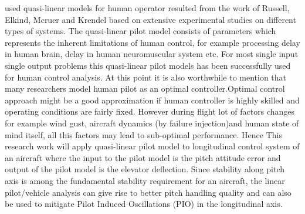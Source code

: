 used quasi-linear models for  human operator resulted from the work of Russell, Elkind, Mcruer and Krendel\cite{hess1990control} based on extensive experimental studies on different types of systems. The quasi-linear pilot model consists of parameters which represents the inherent limitations of human control, for example processing delay in human brain, delay in 
human neuromuscular system etc. For most single input single output problems this quasi-linear pilot models has been successfully used for human control analysis\cite{pool2009pilot}\cite{taylor1967comparison}\cite{ninz1982parametric}. At this point it is also worthwhile to mention that many researchers model human pilot as an optimal controller\cite{baron1969human}\cite{burnham1974identification}.Optimal control approach might be a good approximation if human controller is highly skilled and operating conditions are fairly fixed. However during flight lot of factors changes for example wind gust, aircraft dynamics (by failure injection)and human state of mind itself, all this factors may lead to sub-optimal performance. Hence This research work will apply quasi-linear pilot model to longitudinal control system of an aircraft where the input to the pilot model is the pitch  attitude  error and output of the  pilot  model  is  the  elevator  deflection.  Since  stability  along  pitch  axis  is  among  the  fundamental  stability requirement for an aircraft, the linear pilot/vehicle analysis can give rise to better pitch handling quality and can also be used to mitigate Pilot Induced Oscillations (PIO) in the longitudinal axis.

